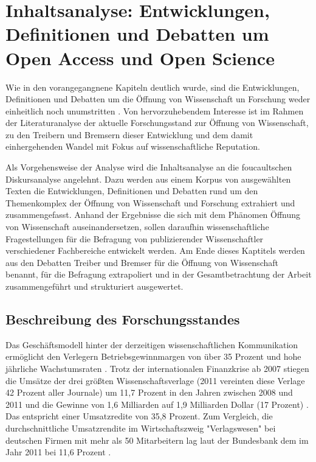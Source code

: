 \chapter{Inhaltsanalyse: Entwicklungen, Definitionen und Debatten um Open Access und Open Science}
Wie in den vorangegangnene Kapiteln deutlich wurde, sind die Entwicklungen, Definitionen und Debatten um die Öffnung von Wissenschaft un Forschung weder einheitlich noch unumstritten \cite{muller_2010_open} \cite{schulze_2013_open}. Von hervorzuhebendem Interesse ist im Rahmen der Literaturanalyse der aktuelle Forschungsstand zur Öffnung von Wissenschaft, zu den Treibern und Bremsern dieser Entwicklung und dem damit einhergehenden Wandel mit Fokus auf wissenschaftliche Reputation. 

Als Vorgehensweise der Analyse wird die Inhaltsanalyse an die foucaultschen Diskursanalyse angelehnt. Dazu werden aus einem Korpus von ausgewählten Texten die Entwicklungen, Definitionen und Debatten rund um den Themenkomplex der Öffnung von Wissenschaft und Forschung extrahiert und zusammengefasst. Anhand der Ergebnisse die sich mit dem Phänomen Öffnung von Wissenschaft auseinandersetzen, sollen daraufhin wissenschaftliche Fragestellungen für die Befragung von publizierender Wissenschaftler verschiedener Fachbereiche entwickelt werden. Am Ende dieses Kaptitels werden aus den Debatten Treiber und Bremser für die Öffnung von Wissenschaft benannt, für die Befragung extrapoliert und in der Gesamtbetrachtung der Arbeit zusammengeführt und strukturiert ausgewertet.

\section{Beschreibung des Forschungsstandes}
Das Geschäftsmodell hinter der derzeitigen wissenschaftlichen Kommunikation ermöglicht den Verlegern Betriebsgewinnmargen von über 35 Prozent \cite{russell_2008_business} \cite{cope2014future} und hohe jährliche Wachstumsraten \cite{Wellcome_Trust_2003}. Trotz der internationalen Finanzkrise ab 2007 stiegen die Umsätze der drei größten Wissenschaftsverlage (2011 vereinten diese Verlage 42 Prozent aller Journale) um 11,7 Prozent in den Jahren zwischen 2008 und 2011 und die Gewinne von 1,6 Milliarden auf 1,9 Milliarden Dollar (17 Prozent) \cite{cope2014future}. Das entspricht einer Umsatzredite von 35,8 Prozent. Zum Vergleich, die durchschnittliche Umsatzrendite im Wirtschaftszweig "Verlagswesen" bei deutschen Firmen mit mehr als 50 Mitarbeitern lag laut der Bundesbank dem im Jahr 2011 bei 11,6 Prozent \cite{bundesbank_2014}.

